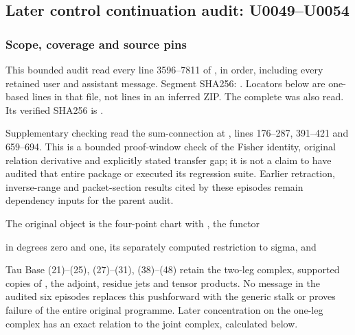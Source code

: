 \subsection{Later control continuation audit:
U0049--U0054}\label{later-control-continuation-audit-u0049u0054}

\subsubsection{Scope, coverage and source
pins}\label{scope-coverage-and-source-pins}

This bounded audit read every line 3596--7811 of
\protect{},
in order, including every retained user and assistant message. Segment
SHA256:
\protect{}.
Locators below are one-based lines in that file, not lines in an
inferred ZIP. The complete
\protect{}
was also read. Its verified SHA256 is
\protect{}.

Supplementary checking read the sum-connection \protect{}
at
\protect{},
lines 176--287, 391--421 and 659--694. This is a bounded proof-window
check of the Fisher identity, original relation derivative and
explicitly stated transfer gap; it is not a claim to have audited that
entire package or executed its regression suite. Earlier retraction,
inverse-range and packet-section results cited by these episodes remain
dependency inputs for the parent audit.

The original object is the four-point chart with
\protect{}, the functor


in degrees zero and one, its separately computed restriction to sigma,
and


Tau Base (21)--(25), (27)--(31), (38)--(48) retain the two-leg complex,
supported copies of \protect{}, the adjoint, residue jets and
tensor products. No message in the audited six episodes replaces this
pushforward with the generic stalk or proves failure of the entire
original programme. Later concentration on the one-leg complex has an
exact relation to the joint complex, calculated below.

